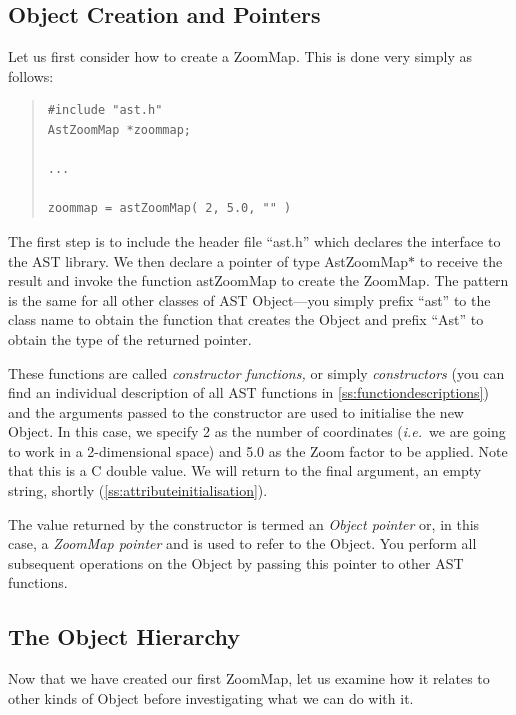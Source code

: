 \documentclass[twoside,11pt]{article}
\newcommand{\htmlref}[2]{#1}
\newcommand{\appref}[1]{Appendix~\ref{#1}}
\newcommand{\secref}[1]{\S\ref{#1}}
\renewcommand{\appref}[1]{\ref{#1}}
\renewcommand{\secref}[1]{\ref{#1}}
\begin{document}
\subsection{\label{ss:objectcreation}Object Creation and Pointers}

Let us first consider how to create a \htmlref{ZoomMap}{ZoomMap}. This is done very
simply as follows:

\begin{quote}
\small
\begin{verbatim}
#include "ast.h"
AstZoomMap *zoommap;

...

zoommap = astZoomMap( 2, 5.0, "" )
\end{verbatim}
\normalsize
\end{quote}

The first step is to include the header file ``ast.h'' which declares
the interface to the AST library.  We then declare a pointer of type
AstZoomMap$*$ to receive the result and invoke the function \htmlref{astZoomMap}{astZoomMap}
to create the ZoomMap. The pattern is the same for all other classes
of AST \htmlref{Object}{Object}---you simply prefix ``ast'' to the class name to obtain
the function that creates the Object and prefix ``Ast'' to obtain the
type of the returned pointer.

These functions are called {\em{constructor functions,}} or simply
{\em{constructors}} (you can find an individual description of all AST
functions in \appref{ss:functiondescriptions}) and the arguments
passed to the constructor are used to initialise the new Object. In
this case, we specify 2 as the number of coordinates ({\em{i.e.}}\ we
are going to work in a 2-dimensional
space) and 5.0 as the \htmlref{Zoom}{Zoom} factor to be applied. Note that this is a C
double value. We will return to the final argument, an empty string,
shortly (\secref{ss:attributeinitialisation}).

The value returned by the constructor is termed an {\em{Object pointer}}
or, in this case, a {\em{ZoomMap pointer}} and is used to refer to the
Object.  You perform all subsequent operations on the Object by
passing this pointer to other AST functions.

\subsection{\label{ss:objecthierarchy}The Object Hierarchy}

Now that we have created our first \htmlref{ZoomMap}{ZoomMap}, let us examine how it
relates to other kinds of \htmlref{Object}{Object} before investigating what we can do
with it.
\end{document}
